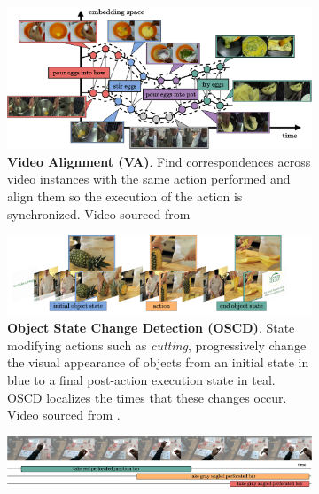 \documentclass[smallextended,twocolumn,natbib]{svjour3}
\begin{document}
\begin{figure}[t]
\begin{minipage}{0.49\textwidth}
\begin{subfigure}{\linewidth}
\label{fig:states::reasoning}
\end{subfigure}
\end{minipage}
\hfill
\begin{minipage}{0.49\textwidth} 
\addtocounter{subfigure}{-1} 
\begin{subfigure}{\linewidth}
\includegraphics[width=\linewidth]{figs/states/states-alignment.pdf}
\caption{\textbf{Video Alignment (VA)}. Find correspondences across video instances with the same action performed and align them so the execution of the action is synchronized. Video sourced from \citep{tang2019coin} \vspace{.5em}}
\label{fig:states::align}
\end{subfigure}
\hfill
\begin{subfigure}{\linewidth}
\includegraphics[width=\linewidth]{figs/states/states-object_state_change.pdf}
\caption{\textbf{Object State Change Detection (OSCD)}. State modifying actions such as \textit{cutting}, progressively change the visual appearance of objects from an initial state in \textcolor{babyblue}{blue} to a final post-action execution state in \textcolor{pastelteal}{teal}. OSCD localizes the times that these changes occur. Video sourced from \citep{souvcek2022look}. \vspace{0.5em}}
\end{subfigure}
\end{minipage} %
\begin{subfigure}{\linewidth}
\includegraphics[width=\linewidth]{figs/states/states-active_object.pdf}

\end{subfigure}
\end{figure}
\end{document}
